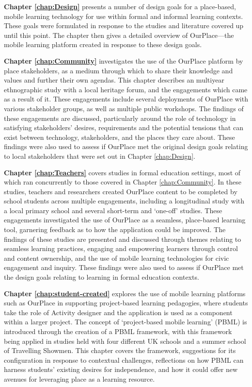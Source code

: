 \textbf{Chapter \ref{chap:Design}} presents a number of design goals for a place-based, mobile learning technology for use within formal and informal learning contexts. These goals were formulated in response to the studies and literature covered up until this point. The chapter then gives a detailed overview of OurPlace---the mobile learning platform created in response to these design goals.

\textbf{Chapter \ref{chap:Community}} investigates the use of the OurPlace platform by place stakeholders, as a medium through which to share their knowledge and values and further their own agendas. This chapter describes an multiyear ethnographic study with a local heritage forum, and the engagements which came as a result of it. These engagements include several deployments of OurPlace with various stakeholder groups, as well as multiple public workshops. The findings of these engagements are discussed, particularly around the role of technology in satisfying stakeholders' desires, requirements and the potential tensions that can exist between technology, stakeholders, and the places they care about. These findings were also used to assess if OurPlace met the original design goals relating to local stakeholders that were set out in Chapter \ref{chap:Design}.

\textbf{Chapter \ref{chap:Teachers}} covers studies in formal education settings, most of which ran concurrently to those covered in Chapter \ref{chap:Community}. In these studies, teachers and researchers created OurPlace content to be completed by school students across multiple engagements, including a longitudinal study with a local primary school and several short-term and `one-off' studies. These engagements investigated the use of OurPlace as a seamless, place-based learning tool, garnering feedback as to how the application could be improved. The findings of these studies are presented and discussed through themes relating to seamless learning practices, engaging and empowering learners through control and content ownership, and the use of mobile learning technologies for civic engagement and inquiry. These findings were also used to assess if OurPlace met the design goals relating to learning in formal education contexts.

\textbf{Chapter \ref{chap:student-created}} explores the use of mobile learning platforms such as OurPlace in supporting project-based learning pedagogies, where students take the role of Activity designer and the application is used as a component within a larger project. The concept of `project-based mobile learning' (PBML) is introduced through the creation of a PBML framework, with this framework being applied in studies held with four different UK schools and a summer school of Travelling Showmen. This chapter covers the framework, suggestions for its configuration in response to contextual challenges, reflections on how PBML can harness students’ existing desires for independence, and how it could offer new avenues for leveraging place as a learning resource. 

